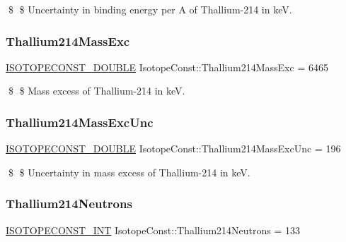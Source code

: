 \$ \$ Uncertainty in binding energy per A of Thallium-\/214 in keV. \mbox{\label{group___isotope_const-_thallium-_tl214_ga111adf74c63968d9cc1edbecd0f7b1ef}} 
\subsubsection{\texorpdfstring{Thallium214\+Mass\+Exc}{Thallium214MassExc}}
{\footnotesize\ttfamily \mbox{\hyperlink{group___isotope_const-_macros_ga8f45a7272ce02c0b4c65c44636ed719a}{I\+S\+O\+T\+O\+P\+E\+C\+O\+N\+S\+T\+\_\+\+D\+O\+U\+B\+LE}} Isotope\+Const\+::\+Thallium214\+Mass\+Exc = 6465}

\$ \$ Mass excess of Thallium-\/214 in keV. \mbox{\label{group___isotope_const-_thallium-_tl214_gabc3cdd86d7ce034617119abae9aa0b35}} 
\subsubsection{\texorpdfstring{Thallium214\+Mass\+Exc\+Unc}{Thallium214MassExcUnc}}
{\footnotesize\ttfamily \mbox{\hyperlink{group___isotope_const-_macros_ga8f45a7272ce02c0b4c65c44636ed719a}{I\+S\+O\+T\+O\+P\+E\+C\+O\+N\+S\+T\+\_\+\+D\+O\+U\+B\+LE}} Isotope\+Const\+::\+Thallium214\+Mass\+Exc\+Unc = 196}

\$ \$ Uncertainty in mass excess of Thallium-\/214 in keV. \mbox{\label{group___isotope_const-_thallium-_tl214_gaecd7dfa1c3ddb2719cca14ac62c6450b}} 
\subsubsection{\texorpdfstring{Thallium214\+Neutrons}{Thallium214Neutrons}}
{\footnotesize\ttfamily \mbox{\hyperlink{group___isotope_const-_macros_ga5f18360b3e99483a35c32d789e62621c}{I\+S\+O\+T\+O\+P\+E\+C\+O\+N\+S\+T\+\_\+\+I\+NT}} Isotope\+Const\+::\+Thallium214\+Neutrons = 133}

